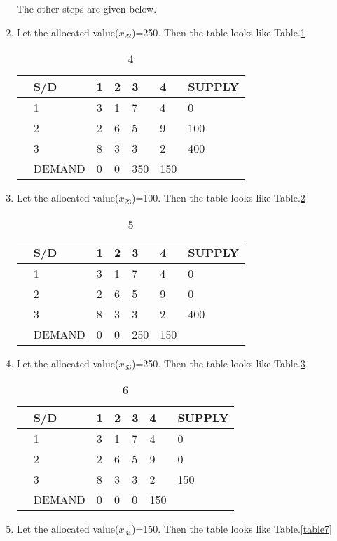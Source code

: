 \documentclass[journal,12pt,twocolumn]{IEEEtran}
\begin{document}
\begin{enumerate}[1.]
The other steps are given below.
\item
Let the allocated value($x_{22}$)=250. Then the table looks like Table.\ref{table4}
\begin{table}[!h]
\begin{center}
\begin{tabular}{l  l | l l l l | l  }
                 
                 & S/D & 1 & 2 & 3 & 4 &  SUPPLY  \\
\hline
& 1 & 3 & 1 & 7 & 4 & 0 \\ 
& 2 & 2 & 6 & 5 & 9 & 100  \\ 
& 3 & 8 & 3 & 3 & 2 & 400 \\ 
\hline
&DEMAND& 0&0&350&150\\ 
\end{tabular}
\end{center}
\caption{4}
\label{table4}
\end{table}
\item
Let the allocated value($x_{23}$)=100. Then the table looks like Table.\ref{table5}
\begin{table}[!h]
\begin{center}
\begin{tabular}{l  l | l l l l | l  }
                 
                 & S/D & 1 & 2 & 3 & 4 &  SUPPLY  \\
\hline
& 1 & 3 & 1 & 7 & 4 & 0 \\ 
& 2 & 2 & 6 & 5 & 9 & 0  \\ 
& 3 & 8 & 3 & 3 & 2 & 400 \\ 
\hline
&DEMAND& 0&0&250&150\\ 
\end{tabular}
\end{center}
\caption{5}
\label{table5}
\end{table}
\item
Let the allocated value($x_{33}$)=250. Then the table looks like Table.\ref{table6}
\begin{table}[!h]
\begin{center}
\begin{tabular}{l  l | l l l l | l  }
                 
                 & S/D & 1 & 2 & 3 & 4 &  SUPPLY  \\
\hline
& 1 & 3 & 1 & 7 & 4 & 0 \\ 
& 2 & 2 & 6 & 5 & 9 & 0  \\ 
& 3 & 8 & 3 & 3 & 2 & 150 \\ 
\hline
&DEMAND& 0&0&0&150\\ 
\end{tabular}
\end{center}
\caption{6}
\label{table6}
\end{table}
\item
Let the allocated value($x_{34}$)=150. Then the table looks like Table.\ref{table7}
\begin{table}[!h]
\begin{center}
\begin{tabular}{l  l | l l l l | l  }
                 

\end{tabular}
\end{center}
\end{table}
\end{enumerate}
\end{document}
